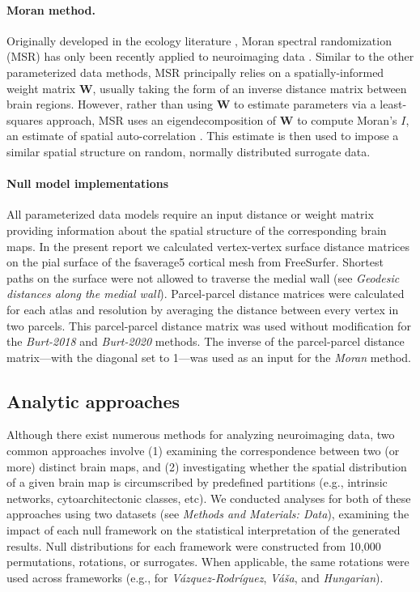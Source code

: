 \documentclass[12pt,aps,pra,reprint,showkeys]{revtex4-1}
\begin{document}
\paragraph*{Moran method.}

Originally developed in the ecology literature \citep{dray2011geoanalysis, wagner2015generating}, Moran spectral randomization (MSR) has only been recently applied to neuroimaging data \citep{paquola2020biorxiv, vosdewael2020brainspace, royer2020neuroimage}.
Similar to the other parameterized data methods, MSR principally relies on a spatially-informed weight matrix $\mathbf{W}$, usually taking the form of an inverse distance matrix between brain regions.
However, rather than using $\mathbf{W}$ to estimate parameters via a least-squares approach, MSR uses an eigendecomposition of $\mathbf{W}$ to compute Moran’s $I$, an estimate of spatial auto-correlation \citep{moran1950biometrika}.
This estimate is then used to impose a similar spatial structure on random, normally distributed surrogate data.

\paragraph*{Null model implementations}

All parameterized data models require an input distance or weight matrix providing information about the spatial structure of the corresponding brain maps.
In the present report we calculated vertex-vertex surface distance matrices on the pial surface of the fsaverage5 cortical mesh from FreeSurfer.
Shortest paths on the surface were not allowed to traverse the medial wall (see \textit{Geodesic distances along the medial wall}).
Parcel-parcel distance matrices were calculated for each atlas and resolution by averaging the distance between every vertex in two parcels.
This parcel-parcel distance matrix was used without modification for the \textit{Burt-2018} and \textit{Burt-2020} methods.
The inverse of the parcel-parcel distance matrix---with the diagonal set to 1---was used as an input for the \textit{Moran} method.

\subsection*{Analytic approaches}

Although there exist numerous methods for analyzing neuroimaging data, two common approaches involve (1) examining the correspondence between two (or more) distinct brain maps, and (2) investigating whether the spatial distribution of a given brain map is circumscribed by predefined partitions (e.g., intrinsic networks, cytoarchitectonic classes, etc).
We conducted analyses for both of these approaches using two datasets (see \textit{Methods and Materials: Data}), examining the impact of each null framework on the statistical interpretation of the generated results.
Null distributions for each framework were constructed from 10,000 permutations, rotations, or surrogates.
When applicable, the same rotations were used across frameworks (e.g., for \textit{V{\'a}zquez-Rodr{\'i}guez}, \textit{V{\'a}{\v{s}}a}, and \textit{Hungarian}).
\end{document}
